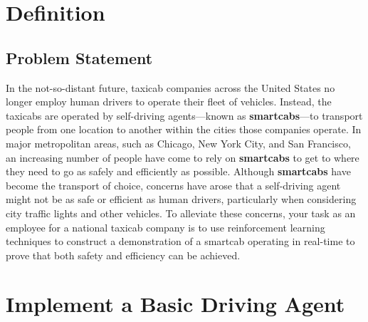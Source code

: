 \documentclass[twoside,openright,titlepage,numbers=noenddot,headinclude,%
               footinclude=true,cleardoublepage=empty,abstractoff,BCOR=5mm,%
               paper=a4,fontsize=11pt,ngerman,american]{scrreprt}
\numberwithin{theorem}{chapter}
\numberwithin{definition}{chapter}
\numberwithin{algorithm}{chapter}
\numberwithin{figure}{chapter}
\numberwithin{table}{chapter}
\numberwithin{equation}{chapter}
\begin{document}
\frenchspacing
\raggedbottom
{}
\pagestyle{plain}





\cleardoublepage


\chapter*{Definition}

\section*{Problem Statement}
In the not-so-distant future, taxicab companies across the United States no longer employ human drivers to operate their fleet of vehicles. Instead, the taxicabs are operated by self-driving agents---known as \textbf{smartcabs}---to transport people from one location to another within the cities those companies operate. In major metropolitan areas, such as Chicago, New York City, and San Francisco, an increasing number of people have come to rely on \textbf{smartcabs} to get to where they need to go as safely and efficiently as possible. Although \textbf{smartcabs} have become the transport of choice, concerns have arose that a self-driving agent might not be as safe or efficient as human drivers, particularly when considering city traffic lights and other vehicles. To alleviate these concerns, your task as an employee for a national taxicab company is to use reinforcement learning techniques to construct a demonstration of a smartcab operating in real-time to prove that both safety and efficiency can be achieved.


%
%

\chapter*{Implement a Basic Driving Agent}
\end{document}
